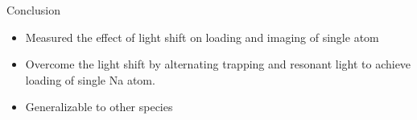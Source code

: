 \documentclass{beamer}
\begin{document}
\begin{frame}
\begin{columns}
\begin{center}
    \end{center}
  \end{columns}
\end{frame}

\begin{frame}[t]{Conclusion}
  \begin{itemize}
  \item Measured the effect of light shift on loading and imaging of single atom
  \item Overcome the light shift by alternating trapping and resonant light to achieve loading of single Na atom.
  \item Generalizable to other species
  \end{itemize}
\end{frame}
\end{document}
